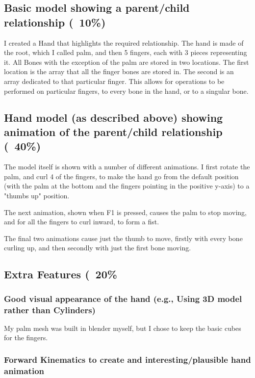 \documentclass{article}
\begin{document}
\subsection{Basic model showing a parent/child relationship (~10\%)}

I created a Hand that highlights the required relationship. The hand is made of the root, which I called palm, and then 5 fingers, each with 3 pieces representing it. All Bones with the exception of the palm are stored in two locations. The first location is the array that all the finger bones are stored in. The second is an array dedicated to that particular finger. This allows for operations to be performed on particular fingers, to every bone in the hand, or to a singular bone.

\subsection{Hand model (as described above) showing animation of the parent/child relationship (~40\%)}

The model itself is shown with a number of different animations. I first rotate the palm, and curl 4 of the fingers, to make the hand go from the default position (with the palm at the bottom and the fingers pointing in the positive y-axis) to a "thumbs up" position.

The next animation, shown when F1 is pressed, causes the palm to stop moving, and for all the fingers to curl inward, to form a fist.

The final two animations cause just the thumb to move, firstly with every bone curling up, and then secondly with just the first bone moving.

\subsection{Extra Features (~20\%}

\subsubsection{Good visual appearance of the hand (e.g., Using 3D model rather than Cylinders)}
My palm mesh was built in blender myself, but I chose to keep the basic cubes for the fingers.

\subsubsection{Forward Kinematics to create and interesting/plausible hand animation}
\end{document}
